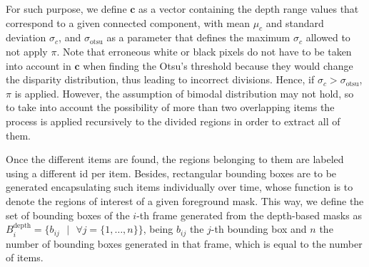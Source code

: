 \documentclass[10pt,twocolumn,letterpaper]{article}
\begin{document}
For such purpose, we define $\mathbf{c}$ as a vector containing the depth range values that correspond to a given connected component, with mean $\mu_{c}$ and standard deviation $\sigma_{c}$, and $\sigma_\mathrm{otsu}$ as a parameter that defines the maximum $\sigma_{c}$ allowed to not apply $\pi$. Note that erroneous white or black pixels do not have to be taken into account in $\mathbf{c}$ when finding the Otsu's threshold because they would change the disparity distribution, thus leading to incorrect divisions. Hence, if $\sigma_{c} > \sigma_\mathrm{otsu}$,  $\pi$ is applied. However, the assumption of bimodal distribution may not hold, so to take into account the possibility of more than two overlapping items the process is applied recursively to the divided regions in order to extract all of them. 

Once the different items are found, the regions belonging to them are labeled using a different id per item. Besides, rectangular bounding boxes are to be generated encapsulating such items individually over time, whose function is to denote the regions of interest of a given foreground mask. This way, we define the set of bounding boxes of the $i$-th frame generated from the depth-based masks as $B^\mathrm{depth}_i = \{b_{ij}\text{ }|\text{ }\forall j = \{1, \ldots, n\} \}$, being $b_{ij}$ the $j$-th bounding box and $n$ the number of bounding boxes generated in that frame, which is equal to the number of items.


\end{document}
